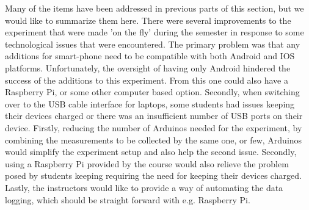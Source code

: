 Many of the items have been addressed in previous parts of this section, but we would like to summarize them here.
There were several improvements to the experiment that were made 'on the fly' during the semester in response to some technological issues that were encountered.
The primary problem was that any additions for smart-phone need to be compatible with both Android and IOS platforms.
Unfortunately, the oversight of having only Android hindered the success of the additions to this experiment.
From this one could also have a Raspberry Pi, or some other computer based option.
Secondly, when switching over to the USB cable interface for laptops, some students had issues keeping their devices charged or there was an insufficient number of USB ports on their device.
Firstly, reducing the number of Arduinos needed for the experiment, by combining the measurements to be collected by the same one, or few, Arduinos would simplify the experiment setup and also help the second issue.
Secondly, using a Raspberry Pi provided by the course would also relieve the problem posed by students keeping requiring the need for keeping their devices charged.
Lastly, the instructors would like to provide a way of automating the data logging, which should be straight forward with e.g. Raspberry Pi.

